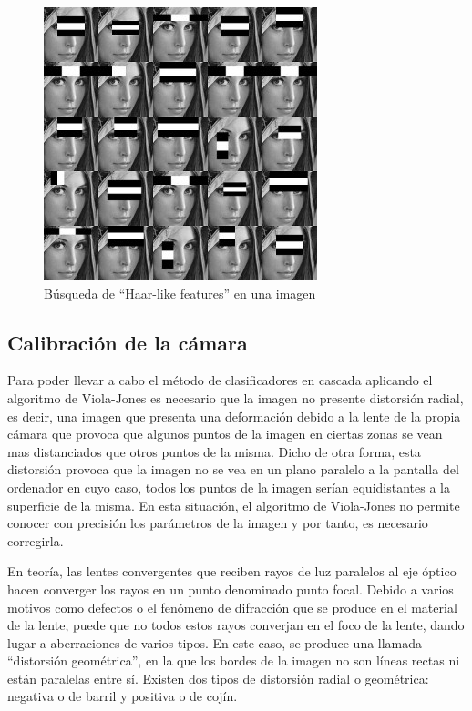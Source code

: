 \begin{figure}
\centering
\includegraphics[scale = 0.7]{capitulo_02/figuras_dir/haarcascade.jpg}
\caption{Búsqueda de ``Haar-like features'' en una imagen}
\end{figure}

 







\subsection{Calibración de la cámara} \label{s2_2_3}

Para poder llevar a cabo el método de clasificadores en cascada aplicando el algoritmo de Viola-Jones es necesario que 
la imagen no presente distorsión radial, es decir, una imagen que presenta una deformación debido a la lente de la propia cámara que provoca que algunos puntos de la imagen en ciertas zonas se vean mas distanciados que otros puntos de la misma. Dicho de otra forma, esta distorsión provoca que la imagen no se vea en un plano paralelo a la pantalla del ordenador en cuyo caso, todos los puntos de la imagen serían equidistantes a la superficie de la misma. En esta situación, el algoritmo de Viola-Jones no permite conocer con precisión los parámetros de la imagen y por tanto, es necesario corregirla.

En teoría, las lentes convergentes que reciben rayos de luz paralelos al eje óptico hacen converger los rayos en un punto denominado punto focal. Debido a varios motivos como defectos o el fenómeno de difracción que se produce en el material de la lente, puede que no todos estos rayos converjan en el foco de la lente, dando lugar a aberraciones de varios tipos. En este caso, se produce una llamada ``distorsión geométrica'', en la que los bordes de la imagen no son líneas rectas ni están paralelas entre sí. Existen dos tipos de distorsión radial o geométrica: negativa o de barril y positiva o de cojín.

